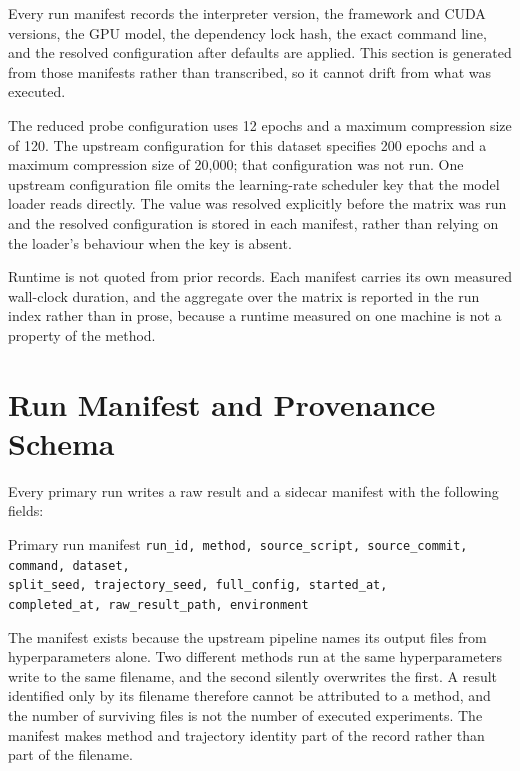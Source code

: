 Every run manifest records the interpreter version, the framework and CUDA
versions, the GPU model, the dependency lock hash, the exact command line, and
the resolved configuration after defaults are applied. This section is generated
from those manifests rather than transcribed, so it cannot drift from what was
executed.

The reduced probe configuration uses 12 epochs and a maximum compression size of
120. The upstream configuration for this dataset specifies 200 epochs and a
maximum compression size of 20{,}000; that configuration was not run. One
upstream configuration file omits the learning-rate scheduler key that the model
loader reads directly. The value was resolved explicitly before the matrix was
run and the resolved configuration is stored in each manifest, rather than
relying on the loader's behaviour when the key is absent.

Runtime is not quoted from prior records. Each manifest carries its own measured
wall-clock duration, and the aggregate over the matrix is reported in the run
index rather than in prose, because a runtime measured on one machine is not a
property of the method.

\section{Run Manifest and Provenance Schema}
\label{sec:appendix-provenance}

Every primary run writes a raw result and a sidecar manifest with the following
fields:

\begin{protocolbox}{Primary run manifest}
\small
\texttt{run\_id, method, source\_script, source\_commit, command, dataset,}\\
\texttt{split\_seed, trajectory\_seed, full\_config, started\_at,}\\
\texttt{completed\_at, raw\_result\_path, environment}
\end{protocolbox}

The manifest exists because the upstream pipeline names its output files from
hyperparameters alone. Two different methods run at the same hyperparameters
write to the same filename, and the second silently overwrites the first. A
result identified only by its filename therefore cannot be attributed to a
method, and the number of surviving files is not the number of executed
experiments. The manifest makes method and trajectory identity part of the
record rather than part of the filename.

